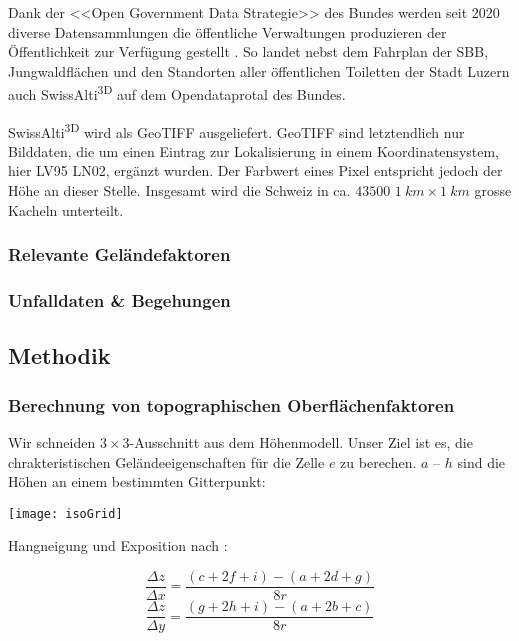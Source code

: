 Dank der <<Open Government Data Strategie>> des Bundes werden seit 2020 diverse Datensammlungen die öffentliche Verwaltungen produzieren der Öffentlichkeit zur Verfügung gestellt \cite{opendataswiss}.
So landet nebst dem Fahrplan der SBB, Jungwaldflächen und den Standorten aller öffentlichen Toiletten der Stadt Luzern auch  SwissAlti\textsuperscript{3D} auf dem Opendataprotal des Bundes.

SwissAlti\textsuperscript{3D} wird als GeoTIFF ausgeliefert. GeoTIFF sind letztendlich nur Bilddaten, die um einen Eintrag zur Lokalisierung in einem Koordinatensystem, hier LV95 LN02, ergänzt wurden. Der Farbwert eines Pixel entspricht jedoch der Höhe an dieser Stelle. Insgesamt wird die Schweiz in ca. $43500$ $\qty{1}{km} \times \qty{1}{km}$ grosse Kacheln unterteilt. \cite{alti3dprod}

\subsubsection{Relevante Geländefaktoren}

\subsubsection{Unfalldaten \& Begehungen}


\subsection{Methodik}
\subsubsection{Berechnung von topographischen Oberflächenfaktoren}

Wir schneiden $3 \times 3$-Ausschnitt aus dem Höhenmodell. Unser Ziel ist es, die chrakteristischen Geländeeigenschaften für die Zelle $e$ zu berechen.
$a$ -- $h$ sind die Höhen an einem bestimmten Gitterpunkt:

\begin{Figure}
  \centering
  \texttt{[image: isoGrid]}
\end{Figure}

Hangneigung und Exposition nach \cite{gisslopeaspect}:

\begin{equation} \label{eq1}
  \frac{\Delta z}{\Delta x} = \frac{(c + 2f + i) - (a + 2d + g)}{8r}
\end{equation}
\begin{equation} \label{eq2}
  \frac{\Delta z}{\Delta y} = \frac{(g + 2h + i) - (a + 2b + c)}{8r}
\end{equation}

